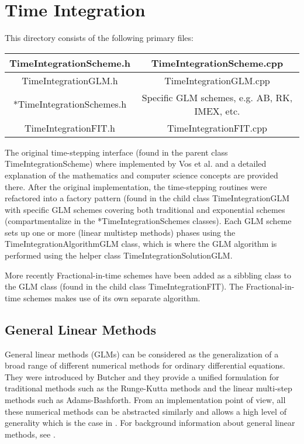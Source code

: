 %
\section{Time Integration}

This directory consists of the following primary files:


\begin{center}
\begin{tabular}{|c | c | } \hline
TimeIntegrationScheme.h & TimeIntegrationScheme.cpp \\ \hline 
TimeIntegrationGLM.h & TimeIntegrationGLM.cpp \\ \hline
*TimeIntegrationSchemes.h & Specific GLM schemes, e.g. AB, RK, IMEX, etc. \\ \hline
TimeIntegrationFIT.h & TimeIntegrationFIT.cpp \\ \hline
\end{tabular}
\end{center}

The original time-stepping interface (found in the parent class
TimeIntegrationScheme) where implemented by Vos et al. \cite{Vostime}
and a detailed explanation of the mathematics and computer science
concepts are provided there.  After the original implementation, the
time-stepping routines were refactored into a factory pattern (found
in the child class TimeIntegrationGLM with specific GLM schemes
covering both traditional and exponential schemes (compartmentalize in
the *TimeIntegrationSchemes classes). Each GLM scheme sets up one or
more (linear multistep methods) phases using the
TimeIntegrationAlgorithmGLM class, which is where the GLM algorithm is
performed using the helper class TimeIntegrationSolutionGLM.


More recently Fractional-in-time schemes have been added as a sibbling
class to the GLM class (found in the child class
TimeIntegrationFIT). The Fractional-in-time schemes makes use of its
own separate algorithm.

\subsection{General Linear Methods}
\label{subsectionGeneralLinearMethods}
General linear methods (GLMs) can be considered as the generalization
of a broad range of different numerical methods for ordinary
differential equations.  They were introduced by Butcher and they
provide a unified formulation for traditional methods such as the
Runge-Kutta methods and the linear multi-step methods such as
Adams-Bashforth.  From an implementation point of view, all these
numerical methods can be abstracted similarly and allows a high level
of generality which is the case in {\nek}. For background information
about general linear methods, see \cite{Bu06}.

